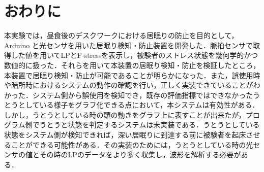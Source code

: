 \section{おわりに}

本実験では，昼食後のデスクワークにおける居眠りの防止を目的として，Arduino と光センサを用いた居眠り検知・防止装置を開発した．脈拍センサで取得した値を用いてLPとF-stressを表示し，被験者のストレス状態を幾何学的かつ数値的に扱った．それらを用いて本装置の居眠り検知・防止を検証したところ，本装置で居眠り検知・防止が可能であることが明らかになった．また，誤使用時や暗所時におけるシステムの動作の確認を行い，正しく実装できていることがわかった．システム側から誤使用を検知でき，既存の評価指標ではできなかったうとうとしている様子をグラフ化できる点において，本システムは有効性がある．しかし，うとうとしている時の頭の動きをグラフ上に表すことが出来たが，プログラム側でうとうと状態を判定するシステムは未実装である．うとうとしている状態をシステム側が検知できれば，深い居眠りに到達する前に被験者を起床させることができる可能性がある．その実装のためには，うとうとしている時の光センサの値とその時のLPのデータをより多く収集し，波形を解析する必要がある．